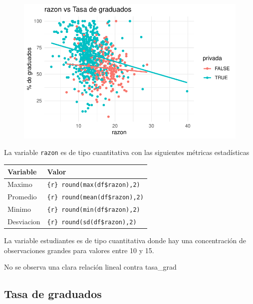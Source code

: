 \documentclass[
  letterpaper,
  DIV=11,
  numbers=noendperiod]{scrartcl}
\begin{document}
\begin{figure}[H]

{\centering \includegraphics{TP_final_files/figure-pdf/unnamed-chunk-20-1.pdf}

}

\end{figure}

La variable \texttt{razon} es de tipo cuantitativa con las siguientes
métricas estadísticas

\begin{longtable}[]{@{}ll@{}}
\toprule\noalign{}
Variable & Valor \\
\midrule\noalign{}
\endhead
\bottomrule\noalign{}
\endlastfoot
Maximo & \texttt{\{r\}\ round(max(df\$razon),2)} \\
Promedio & \texttt{\{r\}\ round(mean(df\$razon),2)} \\
Minimo & \texttt{\{r\}\ round(min(df\$razon),2)} \\
Desviacion & \texttt{\{r\}\ round(sd(df\$razon),2)} \\
\end{longtable}

La variable estudiantes es de tipo cuantitativa donde hay una
concentración de observaciones grandes para valores entre 10 y 15.

No se observa una clara relación lineal contra tasa\_grad

\hypertarget{tasa-de-graduados}{%
\subsection{Tasa de graduados}\label{tasa-de-graduados}}
\end{document}
